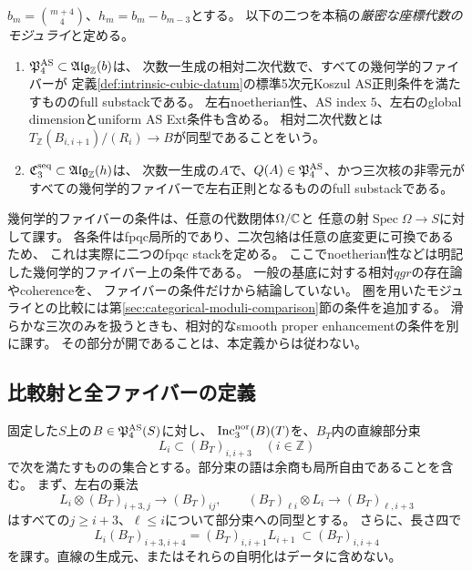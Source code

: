 \begin{definition}[ambientと三次のモジュライ]
\label{def:moduli-two-stacks}
$b_m=\binom{m+4}{4}$、$h_m=b_m-b_{m-3}$とする。
以下の二つを本稿の\emph{厳密な座標代数のモジュライ}と定める。
\begin{enumerate}[label=\textup{(\roman*)}]
\item $\mathfrak P^{\rm AS}_4\subset\mathfrak{Alg}_{\mathbb Z}(b)$は、
次数一生成の相対二次代数で、すべての幾何学的ファイバーが
定義\ref{def:intrinsic-cubic-datum}の標準5次元Koszul AS正則条件を満たすもののfull substackである。
左右noetherian性、AS index $5$、左右のglobal dimensionとuniform AS Ext条件も含める。
相対二次代数とは$T_{\mathbb Z}(B_{i,i+1})/(R_i)\to B$が同型であることをいう。
\item $\mathfrak C^{\rm seq}_3\subset\mathfrak{Alg}_{\mathbb Z}(h)$は、
次数一生成の$A$で、$Q(A)\in\mathfrak P^{\rm AS}_4$、かつ三次核の非零元が
すべての幾何学的ファイバーで左右正則となるもののfull substackである。
\end{enumerate}
\end{definition}

幾何学的ファイバーの条件は、任意の代数閉体$\Omega/\mathbb C$と
任意の射$\operatorname{Spec}\Omega\to S$に対して課す。
各条件はfpqc局所的であり、二次包絡は任意の底変更に可換であるため、
これは実際に二つのfpqc stackを定める。
ここでnoetherian性などは明記した幾何学的ファイバー上の条件である。
一般の基底に対する相対$qgr$の存在論やcoherenceを、
ファイバーの条件だけから結論していない。
圏を用いたモジュライとの比較には第\ref{sec:categorical-moduli-comparison}節の条件を追加する。
滑らかな三次のみを扱うときも、相対的なsmooth proper enhancementの条件を別に課す。
その部分が開であることは、本定義からは従わない。

\subsection{比較射と全ファイバーの定義}

固定した$S$上の$B\in\mathfrak P^{\rm AS}_4(S)$に対し、
$\operatorname{Inc}^{\rm nor}_3(B)(T)$を、$B_T$内の直線部分束
\[
 L_i\subset (B_T)_{i,i+3}\quad(i\in\mathbb Z)
\]
で次を満たすものの集合とする。部分束の語は余商も局所自由であることを含む。
まず、左右の乗法
\begin{equation}\label{eq:moduli-normal-subbundles}
 L_i\otimes (B_T)_{i+3,j}\longrightarrow (B_T)_{ij},\qquad
 (B_T)_{\ell i}\otimes L_i\longrightarrow (B_T)_{\ell,i+3}
\end{equation}
はすべての$j\geq i+3$、$\ell\leq i$について部分束への同型とする。
さらに、長さ四で
\begin{equation}\label{eq:moduli-adjacent-normality}
 L_i(B_T)_{i+3,i+4}=(B_T)_{i,i+1}L_{i+1}
 \ \subset (B_T)_{i,i+4}
\end{equation}
を課す。直線の生成元、またはそれらの自明化はデータに含めない。

